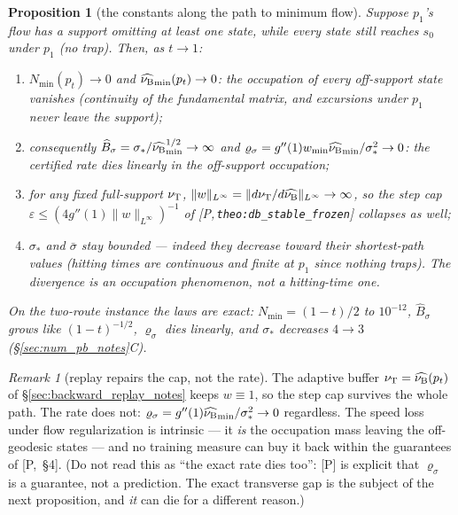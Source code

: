 \documentclass[11pt]{article}
\newtheorem{proposition}[theorem]{Proposition}
\theoremstyle{definition}
\theoremstyle{remark}
\newtheorem{remark}[theorem]{Remark}
\def\lambda{\widehat\nuB}
\newcommand{\paperref}[1]{[P,\,\texttt{#1}]}   %
\begin{document}
\begin{proposition}[the constants along the path to minimum flow]\label{prop:constants_path_notes}
Suppose $p_1$'s flow has a support omitting at least one \emph{state}, while every state still reaches
$s_0$ under $p_1$ (no trap). Then, as $t\to1$:
\begin{enumerate}
    \item $N_{\min}(p_t)\to0$ and $\lambda_{\min}(p_t)\to0$: the occupation of every
    off-support state vanishes (continuity of the fundamental matrix, and excursions
    under $p_1$ never leave the support);
    \item consequently $\widehat B_\sigma = \sigma_*/\lambda_{\min}^{1/2}\to\infty$ and
    $\varrho_\sigma = g''(1)w_{\min}\lambda_{\min}/\sigma_*^2\to0$: \emph{the certified
    rate dies linearly in the off-support occupation};
    \item for any fixed full-support $\nu_{\mathrm{T}}$, $\|w\|_{L^\infty} =
    \|d\nutrain/d\lambda\|_{L^\infty}\to\infty$, so the step cap
    $\varepsilon\leq(4g''(1)\|w\|_{L^\infty})^{-1}$ of \paperref{theo:db\_stable\_frozen}
    collapses as well;
    \item $\sigma_*$ and $\bar\sigma$ stay \emph{bounded} --- indeed they decrease toward
    their shortest-path values (hitting times are continuous and finite at $p_1$ since
    nothing traps). The divergence is an occupation phenomenon, not a hitting-time one.
\end{enumerate}
On the two-route instance the laws are exact: $N_{\min}=(1-t)/2$ to $10^{-12}$,
$\widehat B_\sigma$ grows like $(1-t)^{-1/2}$, $\varrho_\sigma$ dies linearly, and
$\sigma_*$ decreases $4\to3$ (\S\ref{sec:num_pb_notes}C).
\end{proposition}

\begin{remark}[replay repairs the cap, not the rate]\label{rem:replay_rescue_notes}
The adaptive buffer $\nutrain = \lambda(p_t)$ of \S\ref{sec:backward_replay_notes} keeps
$w\equiv1$, so the step cap survives the whole path. The rate does not:
$\varrho_\sigma = g''(1)\lambda_{\min}/\sigma_*^2\to0$ regardless. The speed loss under
flow regularization is intrinsic --- it \emph{is} the occupation mass leaving the
off-geodesic states --- and no training measure can buy it back within the guarantees of
[P,~\S4]. (Do not read this as ``the exact rate dies too'': [P] is explicit that
$\varrho_\sigma$ is a guarantee, not a prediction. The exact transverse gap is the
subject of the next proposition, and \emph{it} can die for a different reason.)
\end{remark}
\end{document}
